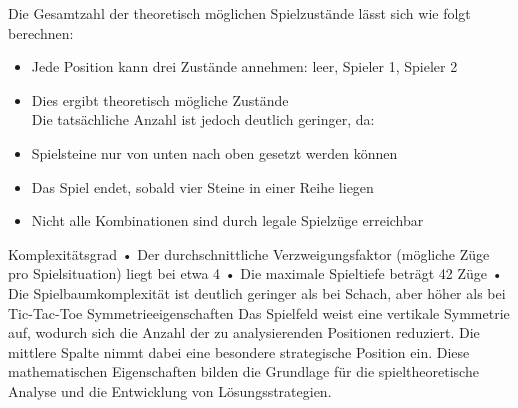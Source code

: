Die Gesamtzahl der theoretisch möglichen Spielzustände lässt sich wie folgt berechnen:
\begin{itemize}
	\item Jede Position kann drei Zustände annehmen: leer, Spieler 1, Spieler 2
	\item Dies ergibt theoretisch  mögliche Zustände\\
	
	Die tatsächliche Anzahl ist jedoch deutlich geringer, da:
	\item Spielsteine nur von unten nach oben gesetzt werden können
	\item Das Spiel endet, sobald vier Steine in einer Reihe liegen
	\item Nicht alle Kombinationen sind durch legale Spielzüge erreichbar
\end{itemize}

Komplexitätsgrad
•	Der durchschnittliche Verzweigungsfaktor (mögliche Züge pro Spielsituation) liegt bei etwa 4
•	Die maximale Spieltiefe beträgt 42 Züge
•	Die Spielbaumkomplexität ist deutlich geringer als bei Schach, aber höher als bei Tic-Tac-Toe
Symmetrieeigenschaften Das Spielfeld weist eine vertikale Symmetrie auf, wodurch sich die Anzahl der zu analysierenden Positionen reduziert. Die mittlere Spalte nimmt dabei eine besondere strategische Position ein.
Diese mathematischen Eigenschaften bilden die Grundlage für die spieltheoretische Analyse und die Entwicklung von Lösungsstrategien.